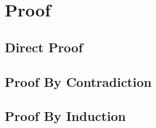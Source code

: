 \section{Proof}

\subsection{Direct Proof}
\subsection{Proof By Contradiction}
\subsection{Proof By Induction}

